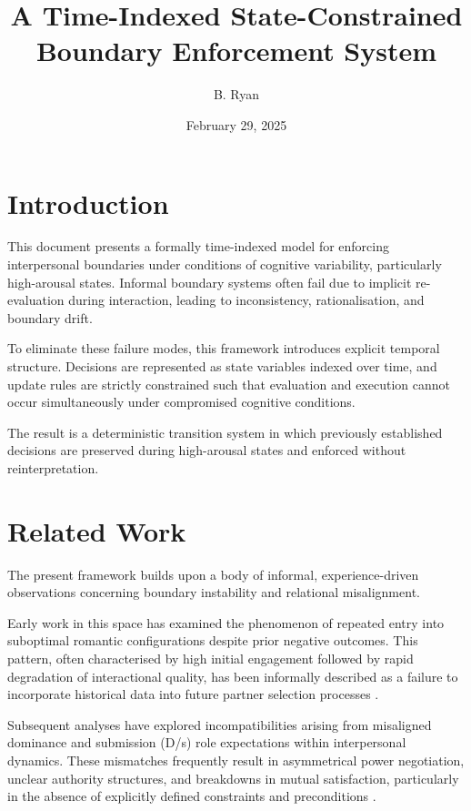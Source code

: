 \documentclass{article}
\begin{document}
	
	\title{A Time-Indexed State-Constrained Boundary Enforcement System}
	\author{
		B. Ryan
	}
	\date{February 29, 2025}
	\maketitle
	
	\section*{Introduction}
	
	This document presents a formally time-indexed model for enforcing interpersonal boundaries under conditions of cognitive variability, particularly high-arousal states. Informal boundary systems often fail due to implicit re-evaluation during interaction, leading to inconsistency, rationalisation, and boundary drift.
	
	To eliminate these failure modes, this framework introduces explicit temporal structure. Decisions are represented as state variables indexed over time, and update rules are strictly constrained such that evaluation and execution cannot occur simultaneously under compromised cognitive conditions.
	
	The result is a deterministic transition system in which previously established decisions are preserved during high-arousal states and enforced without reinterpretation.
	
	\section*{Related Work}
	
	The present framework builds upon a body of informal, experience-driven observations concerning boundary instability and relational misalignment.
	
	Early work in this space has examined the phenomenon of repeated entry into suboptimal romantic configurations despite prior negative outcomes. This pattern, often characterised by high initial engagement followed by rapid degradation of interactional quality, has been informally described as a failure to incorporate historical data into future partner selection processes \cite{recurrent_failure}.
	
	Subsequent analyses have explored incompatibilities arising from misaligned dominance and submission (D/s) role expectations within interpersonal dynamics. These mismatches frequently result in asymmetrical power negotiation, unclear authority structures, and breakdowns in mutual satisfaction, particularly in the absence of explicitly defined constraints and preconditions \cite{precondition_failure}.
	
\end{document}
